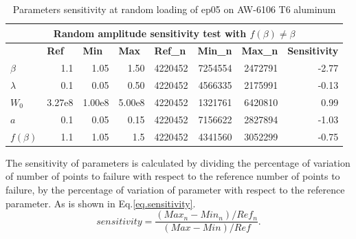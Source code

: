 \documentclass[3p,times,number,review]{elsarticle}
\begin{document}
\begin{table}[!h]
\centering
\begin{tabular}{lrrrrrrr}
\hline
\multicolumn{8}{c}{\textbf{Random amplitude sensitivity test with $f(\beta)\neq\beta$}}                                                                                                                                                                                                   \\ \hline
\textbf{}           & \multicolumn{1}{l}{\textbf{Ref}} & \multicolumn{1}{l}{\textbf{Min}} & \multicolumn{1}{l}{\textbf{Max}} & \multicolumn{1}{l}{\textbf{Ref\_n}} & \multicolumn{1}{l}{\textbf{Min\_n}} & \multicolumn{1}{l}{\textbf{Max\_n}} & \multicolumn{1}{l}{\textbf{Sensitivity}} \\ \hline
\textbf{$\beta$}    & 1.1                              & 1.05                             & 1.50                             & 4220452                             & 7254554                             & 2472791                             & -2.77                                    \\
\textbf{$\lambda$}  & 0.1                              & 0.05                             & 0.50                             & 4220452                             & 4566335                             & 2175991                             & -0.13                                    \\
\textbf{$W_0$}      & 3.27e8                         & 1.00e8                         & 5.00e8                         & 4220452                             & 1321761                             & 6420810                             & 0.99                                     \\
\textbf{$a$}        & 0.1                              & 0.05                             & 0.15                             & 4220452                             & 7156622                             & 2827894                             & -1.03                                    \\
\textbf{$f(\beta)$} & 1.1                              & 1.05                             & 1.5                              & 4220452                             & 4341560                             & 3052299                             & -0.75                                    \\ \hline
\end{tabular}
\caption{Parameters sensitivity at random loading of ep05 on AW-6106 T6 aluminum}
\label{tab.sensitivity_random2}
\end{table}
The sensitivity of parameters is calculated by dividing the percentage of variation of  number of points to failure with respect to the reference number of points to failure, by the percentage of variation of parameter with respect to the reference parameter. As is shown in Eq.\eqref{eq.sensitivity}.
\begin{equation}
sensitivity = \dfrac{\left( Max_n-Min_n\right)/Ref_n}{\left( Max-Min\right)/Ref}.
\label{eq.sensitivity}
\end{equation}
\end{document}
